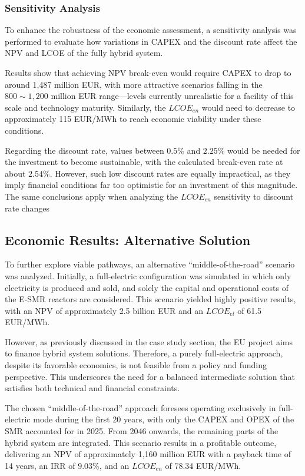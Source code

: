 \subsubsection{Sensitivity Analysis}
To enhance the robustness of the economic assessment, a sensitivity analysis was performed to evaluate how variations in CAPEX and the discount rate affect the NPV and LCOE of the fully hybrid system.

Results show that achieving NPV break-even would require CAPEX to drop to around 1,487 million EUR, with more attractive scenarios falling in the $800 \sim 1,200$ million EUR range—levels currently unrealistic for a facility of this scale and technology maturity. Similarly, the $LCOE_{en}$ would need to decrease to approximately 115 EUR/MWh to reach economic viability under these conditions.

Regarding the discount rate, values between $0.5\%$ and $2.25\%$ would be needed for the investment to become sustainable, with the calculated break-even rate at about $2.54\%$. However, such low discount rates are equally impractical, as they imply financial conditions far too optimistic for an investment of this magnitude. The same conclusions apply when analyzing the $LCOE_{en}$ sensitivity to discount rate changes

\subsection{Economic Results: Alternative Solution}
To further explore viable pathways, an alternative “middle-of-the-road” scenario was analyzed. Initially, a full-electric configuration was simulated in which only electricity is produced and sold, and solely the capital and operational costs of the E-SMR reactors are considered. This scenario yielded highly positive results, with an NPV of approximately 2.5 billion EUR and an $LCOE_{el}$ of 61.5 EUR/MWh.

However, as previously discussed in the case study section, the EU project aims to finance hybrid system solutions. Therefore, a purely full-electric approach, despite its favorable economics, is not feasible from a policy and funding perspective. This underscores the need for a balanced intermediate solution that satisfies both technical and financial constraints.

The chosen “middle-of-the-road” approach foresees operating exclusively in full-electric mode during the first 20 years, with only the CAPEX and OPEX of the SMR accounted for in 2025. From 2046 onwards, the remaining parts of the hybrid system are integrated. This scenario results in a profitable outcome, delivering an NPV of approximately 1,160 million EUR with a payback time of 14 years, an IRR of $9.03\%$, and an $LCOE_{en}$ of 78.34 EUR/MWh.

